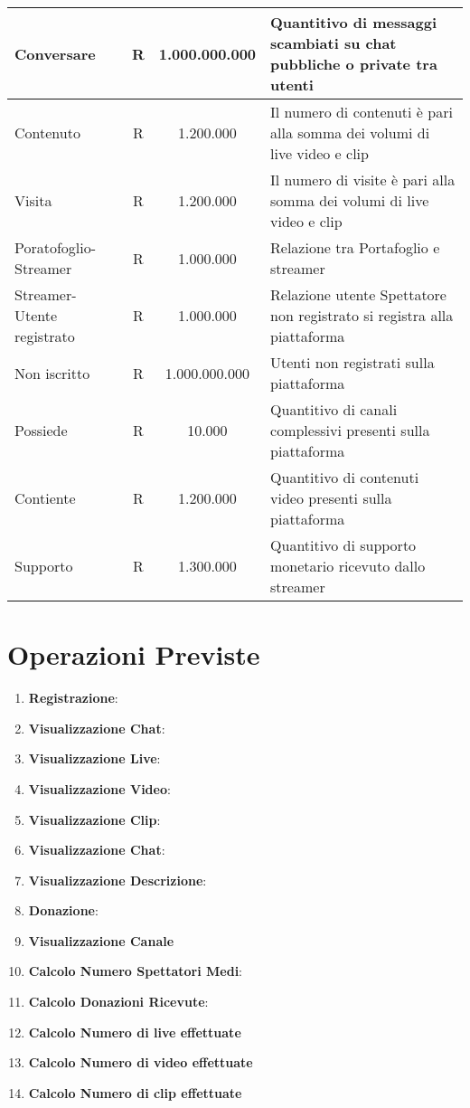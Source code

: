 \begin{longtable}{ |l|c|c|p{6.2cm}|}
  Conversare & R &1.000.000.000 & Quantitivo di messaggi scambiati su chat pubbliche o private tra utenti\\\hline
  Contenuto & R & 1.200.000 & Il numero di contenuti è pari alla somma dei volumi di live video e clip  \\\hline %
  Visita & R & 1.200.000& Il numero di visite è pari alla somma dei volumi di live video e clip \\\hline %
  Poratofoglio-Streamer & R &1.000.000 & Relazione tra Portafoglio e streamer \\\hline 
  Streamer-Utente registrato & R & 1.000.000 & Relazione utente Spettatore non registrato si registra alla piattaforma\\\hline
  Non iscritto & R & 1.000.000.000 & Utenti non registrati sulla piattaforma\\\hline
  Possiede & R & 10.000 &Quantitivo di canali complessivi presenti sulla piattaforma \\\hline
  Contiente & R & 1.200.000&Quantitivo di contenuti video presenti sulla piattaforma \\\hline
  Supporto & R & 1.300.000 &Quantitivo di supporto monetario ricevuto dallo streamer \\\hline

\end{longtable}
\normalsize

\section{Operazioni Previste}
\begin{enumerate}
    \item \textbf{Registrazione}: 
    \item \textbf{Visualizzazione Chat}:
    \item \textbf{Visualizzazione Live}: 
    \item \textbf{Visualizzazione Video}:
    \item \textbf{Visualizzazione Clip}: 
    \item \textbf{Visualizzazione Chat}: 
    \item \textbf{Visualizzazione Descrizione}:
    \item \textbf{Donazione}:
    \item \textbf{Visualizzazione Canale}
    \item \textbf{Calcolo Numero Spettatori Medi}:
    \item \textbf{Calcolo Donazioni Ricevute}: 
    \item \textbf{Calcolo Numero di live effettuate} 
    \item \textbf{Calcolo Numero di video effettuate} 
    \item \textbf{Calcolo Numero di clip effettuate} 
\end{enumerate}
